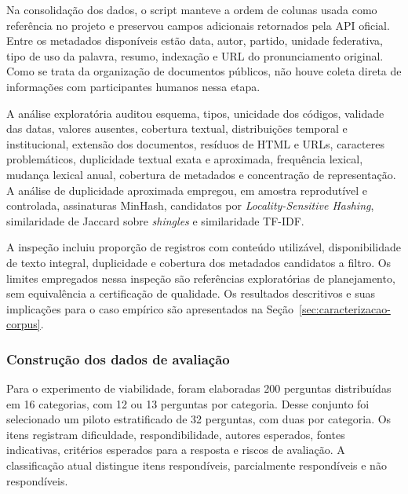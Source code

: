 Na consolidação dos dados, o script manteve a ordem de colunas usada como referência no projeto e preservou campos adicionais retornados pela API oficial. Entre os metadados disponíveis estão data, autor, partido, unidade federativa, tipo de uso da palavra, resumo, indexação e URL do pronunciamento original. Como se trata da organização de documentos públicos, não houve coleta direta de informações com participantes humanos nessa etapa. 

A análise exploratória auditou esquema, tipos, unicidade dos códigos, validade das datas, valores ausentes, cobertura textual, distribuições temporal e institucional, extensão dos documentos, resíduos de HTML e URLs, caracteres problemáticos, duplicidade textual exata e aproximada, frequência lexical, mudança lexical anual, cobertura de metadados e concentração de representação. A análise de duplicidade aproximada empregou, em amostra reprodutível e controlada, assinaturas MinHash, candidatos por \textit{Locality-Sensitive Hashing}, similaridade de Jaccard sobre \textit{shingles} e similaridade TF-IDF.

A inspeção incluiu proporção de registros com conteúdo utilizável, disponibilidade de texto integral, duplicidade e cobertura dos metadados candidatos a filtro. Os limites empregados nessa inspeção são referências exploratórias de planejamento, sem equivalência a certificação de qualidade. Os resultados descritivos e suas implicações para o caso empírico são apresentados na Seção~\ref{sec:caracterizacao-corpus}.


\subsubsection{Construção dos dados de avaliação}\label{sec:construcao-dados}

Para o experimento de viabilidade, foram elaboradas 200 perguntas distribuídas em 16 categorias, com 12 ou 13 perguntas por categoria. Desse conjunto foi selecionado um piloto estratificado de 32 perguntas, com duas por categoria. Os itens registram dificuldade, respondibilidade, autores esperados, fontes indicativas, critérios esperados para a resposta e riscos de avaliação. A classificação atual distingue itens respondíveis, parcialmente respondíveis e não respondíveis.

